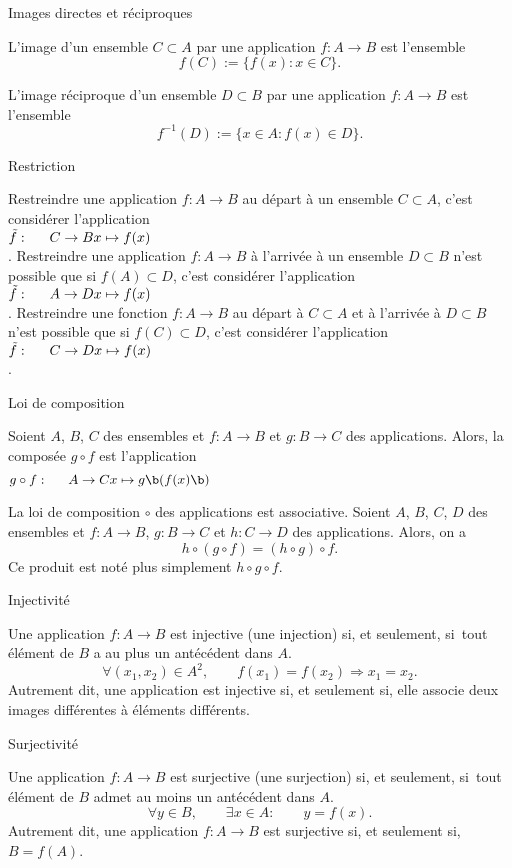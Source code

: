 \Concept [] Images directes et réciproques

\Definition []  L'image  d'un ensemble  $C\subset A$  par une application $f:A\to B$ est l'ensemble 
$$
f(C):=\{f(x):x\in C\}.
$$

\Definition []  L'image réciproque  d'un ensemble  $D\subset B$  par une application $f:A\to B$ est l'ensemble 
$$
f^{-1}(D):=\{x\in A:f(x)\in D\}.
$$


\Concept [] Restriction

\noindent
Restreindre une application $f:A\to B$ au départ à un ensemble $C\subset A$, c'est considérer l'application $\tilde f:\vtop{\mbox{$C\to B$}\mbox{$x\mapsto f(x)$}}$.
\bigskip
\noindent
Restreindre une application $f:A\to B$ à l'arrivée à un ensemble $D\subset B$ n'est possible que si $f(A)\subset D$, c'est considérer l'application $\tilde f:\vtop{\mbox{$A\to D$}\mbox{$x\mapsto f(x)$}}$.
\bigskip
\noindent
Restreindre  une  fonction  $f:A\to B$ au départ à $C\subset A$ et à l'arrivée à $D\subset B$ n'est possible que si
$f(C)\subset D$, c'est considérer l'application $\tilde f:\vtop{\mbox{$C\to D$}\mbox{$x\mapsto f(x)$}}$.


\Concept [] Loi de composition

\Definition []  Soient $A$, $B$, $C$ des ensembles et $f:A\to B$ et $g:B\to C$ des applications. Alors, la composée $g\circ f$ est l'application 
$$
g\circ f:\vtop{\mbox{$A\to C$}\mbox{$x\mapsto g\b(f(x)\b)$}}
$$

\Propriete []  La loi de composition $\circ$ des applications est associative. Soient $A$, $B$, $C$, $D$ des ensembles et $f:A\to B$, $g:B\to C$ et $h:C\to D$ des applications. Alors, on a 
$$
h\circ(g\circ f)=(h\circ g)\circ f.
$$
Ce produit est noté plus simplement $h\circ g\circ f$. 
\bigskip

\Concept [] Injectivité

\Definition []  Une application $f:A\to B$ est injective (une injection) si, et seulement, si~tout élément de $B$ a au plus un antécédent dans $A$. 
$$
\forall (x_1,x_2)\in A^2, \qquad f(x_1)=f(x_2)\Longrightarrow x_1=x_2.
$$
Autrement dit, une application est injective si, et seulement si, elle associe deux images différentes à éléments différents. 

\Concept [] Surjectivité

\Definition []  Une application $f:A\to B$ est surjective (une surjection) si, et seulement, si~tout élément de $B$ admet au moins un antécédent dans $A$. 
$$
\forall y\in B, \qquad \exists x\in A:\qquad y=f(x).
$$
Autrement dit, une application $f:A\to B$ est surjective si, et seulement si, $B=f(A)$. 

